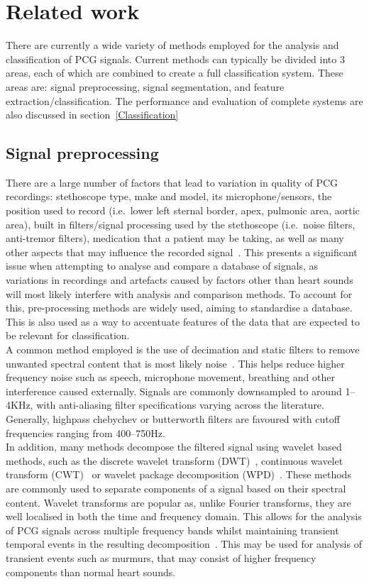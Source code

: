 \documentclass[titlepage, 12pt]{scrartcl} \usepackage{enumitem}
\begin{document}
\section{Related work}
There are currently a wide variety of methods employed for the analysis and
classification of PCG signals. Current methods can typically be divided into 3
areas, each of which are combined to create a full classification system. These
areas are: signal preprocessing, signal segmentation, and feature
extraction/classification. The performance and evaluation of complete systems
are also discussed in section~\ref{Classification}


\subsection{Signal preprocessing}
There are a large number of factors that lead to variation in quality of PCG
recordings: stethoscope type, make and model, its microphone/sensors, the
position used to record (i.e.\ lower left sternal border, apex, pulmonic area,
aortic area), built in filters/signal processing used by the stethoscope (i.e.\
noise filters, anti-tremor filters), medication that a patient may be taking,
as well as many other aspects that may influence the recorded
signal~\parencite[p.4]{Pavlopoulos2004}. This presents a significant issue when
attempting to analyse and compare a database of signals, as variations in
recordings and artefacts caused by factors other than heart sounds will most
likely interfere with analysis and comparison methods. To account for this,
pre-processing methods are widely used, aiming to standardise a database. This
is also used as a way to accentuate features of the data that are expected to
be relevant for classification.\\

A common method employed is the use of decimation and static filters to remove
unwanted spectral content that is most likely noise~\parencite{Liang1997a,
Homsi2016, Springer2016, Gupta2007}. This helps reduce higher frequency noise
such as speech, microphone movement, breathing and other interference caused
externally. Signals are commonly downsampled to around 1--4KHz, with
anti-aliasing filter specifications varying across the literature. Generally,
highpass chebychev or butterworth filters are favoured with cutoff frequencies
ranging from 400--750Hz.\\

In addition, many methods decompose the filtered signal using wavelet based
methods, such as the discrete wavelet transform (DWT)~\parencite{Liang1997a,
Pavlopoulos2004}, continuous wavelet transform (CWT)~\parencite{Langley2016} or
wavelet package decomposition (WPD)~\parencite{Liang1998}. These methods are
commonly used to separate components of a signal based on their spectral
content. Wavelet transforms are popular as, unlike Fourier transforms, they
are well localised in both the time and frequency domain. This allows for the
analysis of PCG signals across multiple frequency bands whilst maintaining
transient temporal events in the resulting
decomposition~\parencite[p.93]{Ari2008}. This may be used for analysis of
transient events such as murmurs, that may consist of higher frequency
components than normal heart sounds.
\end{document}
